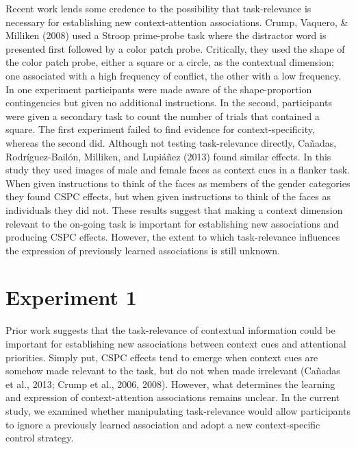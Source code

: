 \documentclass[english,,man,floatsintext]{apa6}
\begin{document}
Recent work lends some credence to the possibility that task-relevance is necessary for establishing new context-attention associations. Crump, Vaquero, \& Milliken (2008) used a Stroop prime-probe task where the distractor word is presented first followed by a color patch probe. Critically, they used the shape of the color patch probe, either a square or a circle, as the contextual dimension; one associated with a high frequency of conflict, the other with a low frequency. In one experiment participants were made aware of the shape-proportion contingencies but given no additional instructions. In the second, participants were given a secondary task to count the number of trials that contained a square. The first experiment failed to find evidence for context-specificity, whereas the second did. Although not testing task-relevance directly, Cañadas, Rodríguez-Bailón, Milliken, and Lupiáñez (2013) found similar effects. In this study they used images of male and female faces as context cues in a flanker task. When given instructions to think of the faces as members of the gender categories they found CSPC effects, but when given instructions to think of the faces as individuals they did not. These results suggest that making a context dimension relevant to the on-going task is important for establishing new associations and producing CSPC effects. However, the extent to which task-relevance influences the expression of previously learned associations is still unknown.

\hypertarget{experiment-1}{%
\section{Experiment 1}\label{experiment-1}}

Prior work suggests that the task-relevance of contextual information could be important for establishing new associations between context cues and attentional priorities. Simply put, CSPC effects tend to emerge when context cues are somehow made relevant to the task, but do not when made irrelevant (Cañadas et al., 2013; Crump et al., 2006, 2008). However, what determines the learning and expression of context-attention associations remains unclear. In the current study, we examined whether manipulating task-relevance would allow participants to ignore a previously learned association and adopt a new context-specific control strategy.
\end{document}
